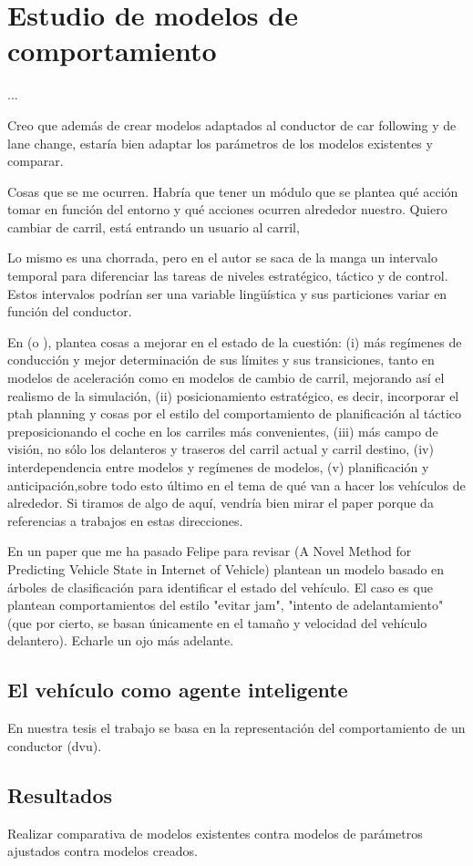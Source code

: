 \chapter{Estudio de modelos de comportamiento}
\label{ch:behavior-models-study}

...

Creo que además de crear modelos adaptados al conductor de car following y de lane change, estaría bien adaptar los parámetros de los modelos existentes y comparar.

Cosas que se me ocurren. Habría que tener un módulo que se plantea qué acción tomar en función del entorno y qué acciones ocurren alrededor nuestro. Quiero cambiar de carril, está entrando un usuario al carril,

Lo mismo es una chorrada, pero en \cite{Alexiadis2004} el autor se saca de la manga un intervalo temporal para diferenciar las tareas de niveles estratégico, táctico y de control. Estos intervalos podrían ser una variable lingüística y sus particiones variar en función del conductor.

En \cite{Toledo2007} (o \cite{Toledo2007-3}), plantea cosas a mejorar en el estado de la cuestión: (i) más regímenes de conducción y mejor determinación de sus límites y sus transiciones, tanto en modelos de aceleración como en modelos de cambio de carril, mejorando así el realismo de la simulación, (ii) posicionamiento estratégico, es decir, incorporar el ptah planning y cosas por el estilo del comportamiento de planificación al táctico preposicionando el coche en los carriles más convenientes, (iii) más campo de visión, no sólo los delanteros y traseros del carril actual y carril destino, (iv) interdependencia entre modelos y regímenes de modelos, (v) planificación y anticipación,sobre todo esto último en el tema de qué van a hacer los vehículos de alrededor. Si tiramos de algo de aquí, vendría bien mirar el paper porque da referencias a trabajos en estas direcciones.

En un paper que me ha pasado Felipe para revisar (A Novel Method for Predicting Vehicle State in Internet of Vehicle) plantean un modelo basado en árboles de clasificación para identificar el estado del vehículo. El caso es que plantean comportamientos del estilo "evitar jam", "intento de adelantamiento" (que por cierto, se basan únicamente en el tamaño y velocidad del vehículo delantero). Echarle un ojo más adelante.

\section{El vehículo como agente inteligente}

En nuestra tesis el trabajo se basa en la representación del comportamiento de un conductor (\gls{dvu}).

\section{Resultados}
\label{ch:behavior-models-study:results}

Realizar comparativa de modelos existentes contra modelos de parámetros ajustados contra modelos creados.